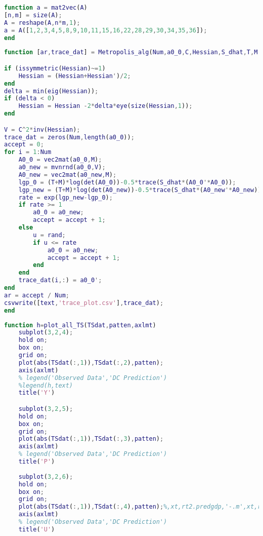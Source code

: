 \documentclass[11pt, oneside]{article}   	%
\begin{document}
\begin{appendices}
\begin{lstlisting}[language=Matlab ,caption={\textit{mat2vec.m} transfers a vector $a_0$ of free variables in matrix $A_0$ into a matrix $A_0$.}, label={code:mat2vec}]
function a = mat2vec(A)
[n,m] = size(A);
A = reshape(A,n*m,1);
a = A([1,2,3,4,5,8,9,10,11,15,16,22,28,29,30,34,35,36]);
end
\end{lstlisting}

\begin{lstlisting}[language=Matlab ,caption={\textit{Metropolis\textunderscore alg.m} implements MCMC using Metropolis algorithm.}, label={code:Metropolis_alg}]
function [ar,trace_dat] = Metropolis_alg(Num,a0_0,C,Hessian,S_dhat,T,M,text)

if (issymmetric(Hessian)~=1)
    Hessian = (Hessian+Hessian')/2;
end
delta = min(eig(Hessian));
if (delta < 0)
    Hessian = Hessian -2*delta*eye(size(Hessian,1));
end

V = C^2*inv(Hessian);
trace_dat = zeros(Num,length(a0_0));
accept = 0;
for i = 1:Num
    A0_0 = vec2mat(a0_0,M);
    a0_new = mvnrnd(a0_0,V);
    A0_new = vec2mat(a0_new,M);
    lgp_0 = (T+M)*log(det(A0_0))-0.5*trace(S_dhat*(A0_0'*A0_0));
    lgp_new = (T+M)*log(det(A0_new))-0.5*trace(S_dhat*(A0_new'*A0_new));
    rate = exp(lgp_new-lgp_0);
    if rate >= 1
        a0_0 = a0_new;
        accept = accept + 1;
    else
        u = rand;
        if u <= rate
            a0_0 = a0_new;
            accept = accept + 1;
        end
    end
    trace_dat(i,:) = a0_0';
end
ar = accept / Num;
csvwrite([text,'trace_plot.csv'],trace_dat);
end
\end{lstlisting}

\begin{lstlisting}[language=Matlab ,caption={\textit{plot\textunderscore all\textunderscore TS} plots impulse response functions (w.r.t $t$) into subplots.}, label={code:plot_all_TS}]
function h=plot_all_TS(TSdat,patten,axlmt)
    subplot(3,2,4);
    hold on;
    box on;
    grid on;
    plot(abs(TSdat(:,1)),TSdat(:,2),patten);
    axis(axlmt)
    % legend('Observed Data','DC Prediction')
    %legend(h,text)
    title('Y')

    subplot(3,2,5);
    hold on;
    box on;
    grid on;
    plot(abs(TSdat(:,1)),TSdat(:,3),patten);
    axis(axlmt)
    % legend('Observed Data','DC Prediction')
    title('P')
    
    subplot(3,2,6);
    hold on;
    box on;
    grid on;
    plot(abs(TSdat(:,1)),TSdat(:,4),patten);%,xt,rt2.predgdp,'-.m',xt,rt3.predgdp,'--c',xt,rt4.predgdp,':r')
    axis(axlmt)
    % legend('Observed Data','DC Prediction')
    title('U')
    

\end{lstlisting}
\end{appendices}
\end{document}
